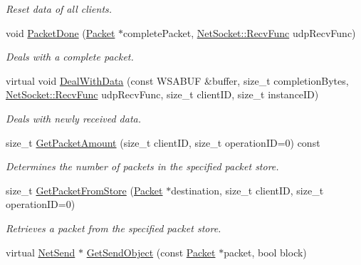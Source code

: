 \begin{DoxyCompactItemize}
\begin{DoxyCompactList}\small\item\em Reset data of all clients. \item\end{DoxyCompactList}\item 
void \hyperlink{class_net_mode_udp_catch_all_acfc10ca9c1b4204fdbb021bf755e4e55}{PacketDone} (\hyperlink{class_packet}{Packet} $\ast$completePacket, \hyperlink{class_net_socket_a52b5f4de8d0a47fd8620f542b21c076c}{NetSocket::RecvFunc} udpRecvFunc)
\begin{DoxyCompactList}\small\item\em Deals with a complete packet. \item\end{DoxyCompactList}\item 
virtual void \hyperlink{class_net_mode_udp_catch_all_adc52011adf841020e996d6c50f6fb7c1}{DealWithData} (const WSABUF \&buffer, size\_\-t completionBytes, \hyperlink{class_net_socket_a52b5f4de8d0a47fd8620f542b21c076c}{NetSocket::RecvFunc} udpRecvFunc, size\_\-t clientID, size\_\-t instanceID)
\begin{DoxyCompactList}\small\item\em Deals with newly received data. \item\end{DoxyCompactList}\item 
size\_\-t \hyperlink{class_net_mode_udp_catch_all_a56defc6f6d09211a49cc5c110cfb3fcf}{GetPacketAmount} (size\_\-t clientID, size\_\-t operationID=0) const 
\begin{DoxyCompactList}\small\item\em Determines the number of packets in the specified packet store. \item\end{DoxyCompactList}\item 
size\_\-t \hyperlink{class_net_mode_udp_catch_all_a79fa50275b49fed4af9cce8756a81394}{GetPacketFromStore} (\hyperlink{class_packet}{Packet} $\ast$destination, size\_\-t clientID, size\_\-t operationID=0)
\begin{DoxyCompactList}\small\item\em Retrieves a packet from the specified packet store. \item\end{DoxyCompactList}\item 
virtual \hyperlink{class_net_send}{NetSend} $\ast$ \hyperlink{class_net_mode_udp_catch_all_a31fc998bff9b19d93f7437ae7f03d7ef}{GetSendObject} (const \hyperlink{class_packet}{Packet} $\ast$packet, bool block)

\end{DoxyCompactItemize}
